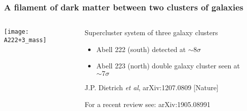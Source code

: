 





\begin{frame}
  \frametitle{A filament of dark matter between two clusters of galaxies}
  \begin{columns}
  \begin{column}{0.45\textwidth}
  \texttt{[image: A222+3\_mass]}
  \end{column}
  \begin{column}{0.55\textwidth}

    \begin{block}{Supercluster
system of three galaxy clusters}
    \begin{itemize}
    \item Abell 222 (south) detected at $\sim 8\sigma$
    \item Abell 223 (north) double galaxy cluster seen at $\sim 7\sigma$   
    \end{itemize}

    \end{block}



  


    {\tiny J.P. Dietrich \emph{et al}, arXiv:1207.0809 [Nature]}

   {\tiny For a recent review see: arXiv:1905.08991}  
  \end{column}
  \end{columns}

\end{frame}

